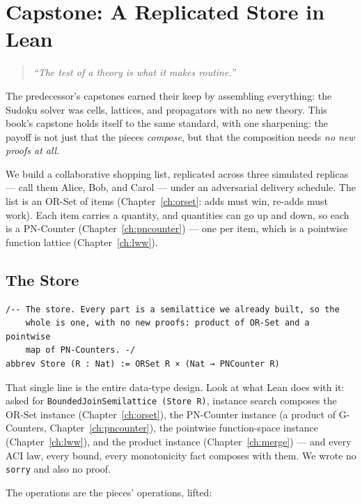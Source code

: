 \documentclass[12pt, a4paper, openright]{book}
\theoremstyle{thmstyle}
\theoremstyle{defstyle}
\newcommand{\lc}[1]{\texttt{#1}}
\begin{document}
\chapter{Capstone: A Replicated Store in Lean}
\label{ch:capstone}

\begin{quote}
  \itshape
  ``The test of a theory is what it makes routine.''
\end{quote}

The predecessor's capstones earned their keep by assembling everything:
the Sudoku solver was cells, lattices, and propagators with no new
theory. This book's capstone holds itself to the same standard, with one
sharpening: the payoff is not just that the pieces \emph{compose}, but
that the composition needs \emph{no new proofs at all}.

We build a collaborative shopping list, replicated across three
simulated replicas --- call them Alice, Bob, and Carol --- under an
adversarial delivery schedule. The list is an OR-Set of items
(Chapter~\ref{ch:orset}: adds must win, re-adds must work). Each item
carries a quantity, and quantities can go up and down, so each is a
PN-Counter (Chapter~\ref{ch:pncounter}) --- one per item, which is a
pointwise function lattice (Chapter~\ref{ch:lww}).

\section{The Store}

\begin{verbatim}
/-- The store. Every part is a semilattice we already built, so the
    whole is one, with no new proofs: product of OR-Set and a pointwise
    map of PN-Counters. -/
abbrev Store (R : Nat) := ORSet R × (Nat → PNCounter R)
\end{verbatim}

That single line is the entire data-type design. Look at what Lean does
with it: asked for \lc{BoundedJoinSemilattice (Store R)}, instance
search composes the OR-Set instance (Chapter~\ref{ch:orset}), the
PN-Counter instance (a product of G-Counters,
Chapter~\ref{ch:pncounter}), the pointwise function-space instance
(Chapter~\ref{ch:lww}), and the product instance
(Chapter~\ref{ch:merge}) --- and every ACI law, every bound, every
monotonicity fact composes with them. We wrote no \lc{sorry} and also no
proof.

The operations are the pieces' operations, lifted:
\end{document}
